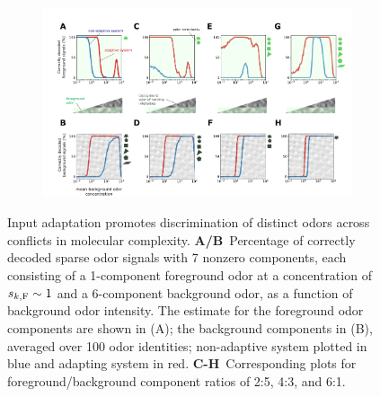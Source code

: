 \begin{figure}[!tb]
	\begin{subfigure}[t]{\linewidth}
		\includegraphics[width=\textwidth]{figures/Figures_signal_discrimination_weber_law}
		\label{fig:signal_discrimination_a}
	\end{subfigure}
	\begin{subfigure}[t]{0\linewidth}
		\label{fig:signal_discrimination_b}
	\end{subfigure}
	\begin{subfigure}[t]{0\linewidth}
 		\label{fig:signal_discrimination_c}
	\end{subfigure}
	\begin{subfigure}[t]{0\linewidth}
		\label{fig:signal_discrimination_d}
	\end{subfigure}
	\begin{subfigure}[t]{0\linewidth}
		\label{fig:signal_discrimination_e}
	\end{subfigure}
	\begin{subfigure}[t]{0\linewidth}
		\label{fig:signal_discrimination_f}
	\end{subfigure}
	\begin{subfigure}[t]{0\linewidth}
		\label{fig:signal_discrimination_g}
	\end{subfigure}
	\begin{subfigure}[t]{0\linewidth}
		\label{fig:signal_discrimination_h}
	\end{subfigure}
	\caption{\footnotesize{Input adaptation promotes discrimination of distinct odors across conflicts in molecular complexity. \textbf{A/B}~Percentage of correctly decoded sparse odor signals with 7 nonzero components, each consisting of a 1-component foreground odor at a concentration of $s_{k, \text F} \sim 1$ and a 6-component background odor, as a function of background odor intensity. The estimate for the foreground odor components are shown in (A); the background components in (B), averaged over 100 odor identities; non-adaptive system plotted in blue and adapting system in red. \textbf{C-H}~Corresponding plots for foreground/background component ratios of 2:5, 4:3, and 6:1.}}
	\label{fig:signal_discrimination}
\end{figure}

